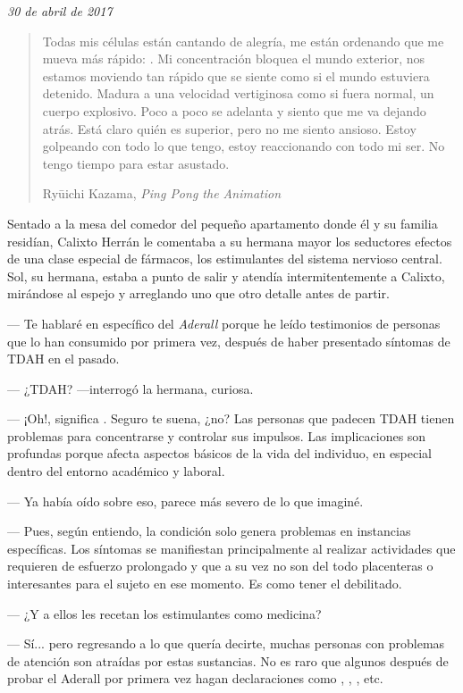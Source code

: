 \documentclass[12pt]{article}
\begin{document}
	\textit{30 de abril de 2017}

	\blockquote[Ryūichi Kazama, \textit{Ping Pong the Animation}]
	{
		Todas mis células están cantando de alegría, me están ordenando
		que me mueva más rápido: .
		Mi concentración bloquea el mundo exterior, nos estamos moviendo
		tan rápido que se siente como si el mundo estuviera detenido.
		Madura a una velocidad vertiginosa como si fuera normal, un
		cuerpo explosivo. Poco a poco se adelanta y siento
		que me va dejando atrás. Está claro quién es superior, pero no
		me siento ansioso. Estoy golpeando con todo lo que tengo, estoy
		reaccionando con todo mi ser. No tengo tiempo para estar
		asustado.
	}

	Sentado a la mesa del comedor del pequeño apartamento donde él y su
	familia residían, Calixto Herrán le comentaba a su hermana mayor los
	seductores efectos de una clase especial de fármacos, los
	estimulantes del sistema nervioso central. Sol, su hermana, estaba
	a punto de salir y atendía intermitentemente a Calixto, mirándose
	al espejo y arreglando uno que otro detalle antes de partir.

	--- Te hablaré en específico del \textit{Aderall} porque he leído
	testimonios de personas que lo han consumido por primera vez, después de
	haber presentado síntomas de TDAH en el pasado.

	--- ¿TDAH? ---interrogó la hermana, curiosa.

	--- ¡Oh!, significa . Seguro te suena, ¿no? Las personas que padecen TDAH
	tienen problemas para concentrarse y controlar sus impulsos. Las
	implicaciones son profundas porque afecta aspectos básicos de la vida
	 del individuo, en especial dentro del entorno
	académico y laboral.

	--- Ya había oído sobre eso, parece más severo de lo que imaginé.

	--- Pues, según entiendo, la condición solo genera problemas en
	instancias específicas. Los síntomas se manifiestan principalmente al
	realizar actividades que requieren de esfuerzo prolongado y que a su vez
	no son del todo placenteras o interesantes para el sujeto en ese
	momento. Es como tener el 
	debilitado.

	--- ¿Y a ellos les recetan los estimulantes como medicina?

	--- Sí... pero regresando a lo que quería decirte, muchas personas con
	problemas de atención son atraídas por estas sustancias. No es raro
	que algunos después de probar el Aderall por primera vez hagan
	declaraciones como , , , etc.
\end{document}
